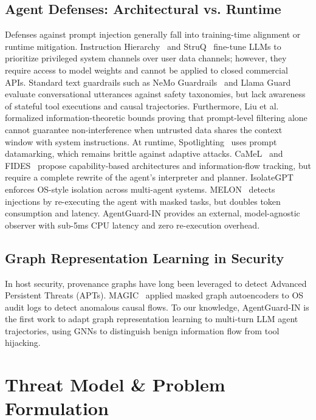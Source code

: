 \documentclass[conference]{IEEEtran}
\begin{document}
\subsection{Agent Defenses: Architectural vs. Runtime}
Defenses against prompt injection generally fall into training-time alignment or runtime mitigation. Instruction Hierarchy~\cite{instructionhierarchy2024} and StruQ~\cite{struq2025} fine-tune LLMs to prioritize privileged system channels over user data channels; however, they require access to model weights and cannot be applied to closed commercial APIs. Standard text guardrails such as NeMo Guardrails~\cite{nemoguardrails2023} and Llama Guard~\cite{llamaguard2023} evaluate conversational utterances against safety taxonomies, but lack awareness of stateful tool executions and causal trajectories. Furthermore, Liu et al.~\cite{liu2024formalizing} formalized information-theoretic bounds proving that prompt-level filtering alone cannot guarantee non-interference when untrusted data shares the context window with system instructions. At runtime, Spotlighting~\cite{spotlighting2024} uses prompt datamarking, which remains brittle against adaptive attacks. CaMeL~\cite{camel2025} and FIDES~\cite{fides2025} propose capability-based architectures and information-flow tracking, but require a complete rewrite of the agent's interpreter and planner. IsolateGPT~\cite{isolategpt2025} enforces OS-style isolation across multi-agent systems. MELON~\cite{melon2025} detects injections by re-executing the agent with masked tasks, but doubles token consumption and latency. AgentGuard-IN provides an external, model-agnostic observer with sub-5ms CPU latency and zero re-execution overhead.

\subsection{Graph Representation Learning in Security}
In host security, provenance graphs have long been leveraged to detect Advanced Persistent Threats (APTs). MAGIC~\cite{magic2024} applied masked graph autoencoders to OS audit logs to detect anomalous causal flows. To our knowledge, AgentGuard-IN is the first work to adapt graph representation learning to multi-turn LLM agent trajectories, using GNNs to distinguish benign information flow from tool hijacking.

\section{Threat Model \& Problem Formulation}
\label{sec:threat_model}
\end{document}
